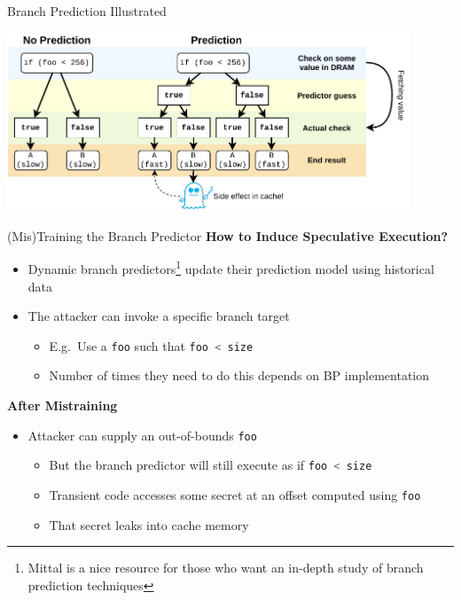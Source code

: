 \documentclass[10pt, dvipsnames, aspectratio=169]{beamer}
\let\lsi\lstinline
\newcommand{\code}[1]{\lsi[language=c]|#1|}
\begin{document}
\begingroup
\setwatermark{}
\begin{frame}[c]{Branch Prediction Illustrated}
  \begin{center}
    \color{black}
    \includegraphics[width=0.9\textwidth]{figs/prediction.pdf}
  \end{center}
\end{frame}
\endgroup

\begin{frame}[c]{(Mis)Training the Branch Predictor}{}
  {\bf How to Induce Speculative Execution?}
  \begin{itemize}
    \item Dynamic branch predictors\footnote{Mittal \cite{mittal2019_branch_prediction} is a nice resource for those who want an in-depth study of branch prediction techniques} update their prediction model using historical data
    \item The attacker can invoke a specific branch target
    \begin{itemize}
      \item E.g.~Use a \code{foo} such that \code{foo < size}
      \item Number of times they need to do this depends on BP implementation
    \end{itemize}
  \end{itemize}

  \vfill
  {\bf After Mistraining}
  \begin{itemize}
    \item Attacker can supply an out-of-bounds \code{foo}
    \begin{itemize}
      \item But the branch predictor will still execute as if \code{foo < size}
      \item Transient code accesses some secret at an offset computed using \code{foo}
      \item That secret leaks into cache memory
    \end{itemize}
  \end{itemize}
\end{frame}
\end{document}
